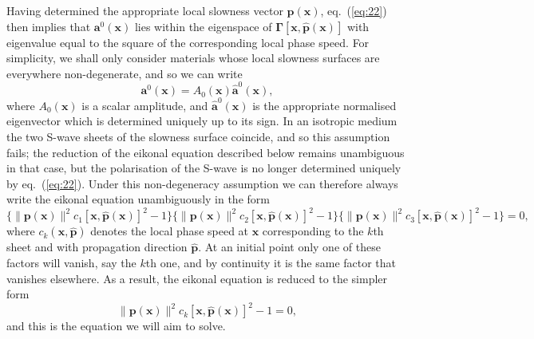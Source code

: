 Having determined the appropriate local slowness vector $\mathbf{p}(\mathbf{x})$, eq.~(\ref{eq:22}) then implies that $\mathbf{a}^{0}(\mathbf{x})$ lies 
within the eigenspace of $\bm{\Gamma}[\mathbf{x},\hat{\mathbf{p}}(\mathbf{x})]$ with eigenvalue equal to the square of the corresponding 
local phase speed. For simplicity, we shall only consider materials whose local slowness surfaces are everywhere non-degenerate, and so we can write
\begin{equation}
\mathbf{a}^{0}(\mathbf{x})=A_{0}(\mathbf{x})\hat{\mathbf{a}}^{0}(\mathbf{x}),
\label{eq:24}
\end{equation}
where $A_{0}(\mathbf{x})$ is a scalar amplitude, and $\hat{\mathbf{a}}^{0}(\mathbf{x})$ is the appropriate normalised eigenvector which is 
determined uniquely up to its sign. In an isotropic medium the two S-wave sheets of the slowness surface coincide, and so this assumption 
fails; the reduction of the eikonal equation described below remains unambiguous in that case, but the polarisation of the S-wave is no longer 
determined uniquely by eq.~(\ref{eq:22}). Under this non-degeneracy assumption we can therefore always write the eikonal equation unambiguously in the form
\begin{equation}
\{\|\mathbf{p}(\mathbf{x})\|^{2}c_{1}[\mathbf{x},\hat{\mathbf{p}}(\mathbf{x})]^{2}-1\}\{\|\mathbf{p}(\mathbf{x})\|^{2}c_{2}[\mathbf{x},\hat{\mathbf{p}}(\mathbf{x})]^{2}-1\}\{\|\mathbf{p}(\mathbf{x})\|^{2}c_{3}[\mathbf{x},\hat{\mathbf{p}}(\mathbf{x})]^{2}-1\}=0,
\label{eq:25}
\end{equation}
where $c_{k}(\mathbf{x},\hat{\mathbf{p}})$ denotes the local phase speed at $\mathbf{x}$ corresponding to the $k$th sheet and with 
propagation direction $\hat{\mathbf{p}}$. At an initial point only one of these factors will vanish, say the $k$th one,
and by continuity it is the same factor that vanishes elsewhere. As a result, the eikonal equation is reduced to the simpler form
\begin{equation}
\|\mathbf{p}(\mathbf{x})\|^{2}c_{k}[\mathbf{x},\hat{\mathbf{p}}(\mathbf{x})]^{2}-1=0,
\label{eq:26}
\end{equation}
and this is the equation we will aim to solve.

